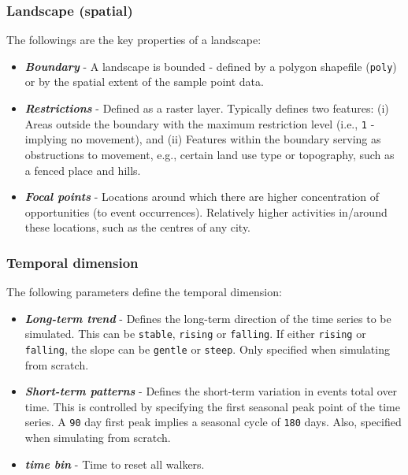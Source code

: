 \documentclass[
  16pt,
]{article}
\providecommand{\tightlist}{%
  \setlength{\itemsep}{0pt}\setlength{\parskip}{0pt}}
\begin{document}
\hypertarget{landscape-spatial}{%
\subsubsection{Landscape (spatial)}\label{landscape-spatial}}

The followings are the key properties of a landscape:

\begin{itemize}
\tightlist
\item
  \textbf{\emph{Boundary}} - A landscape is bounded - defined by a
  polygon shapefile (\texttt{poly}) or by the spatial extent of the
  sample point data.
\item
  \textbf{\emph{Restrictions}} - Defined as a raster layer. Typically
  defines two features: (i) Areas outside the boundary with the maximum
  restriction level (i.e., \texttt{1} - implying no movement), and (ii)
  Features within the boundary serving as obstructions to movement,
  e.g., certain land use type or topography, such as a fenced place and
  hills.
\item
  \textbf{\emph{Focal points}} - Locations around which there are higher
  concentration of opportunities (to event occurrences). Relatively
  higher activities in/around these locations, such as the centres of
  any city.
\end{itemize}

\hypertarget{temporal-dimension}{%
\subsubsection{Temporal dimension}\label{temporal-dimension}}

The following parameters define the temporal dimension:

\begin{itemize}
\tightlist
\item
  \textbf{\emph{Long-term trend}} - Defines the long-term direction of
  the time series to be simulated. This can be \texttt{stable},
  \texttt{rising} or \texttt{falling}. If either \texttt{rising} or
  \texttt{falling}, the slope can be \texttt{gentle} or \texttt{steep}.
  Only specified when simulating from scratch.
\item
  \textbf{\emph{Short-term patterns}} - Defines the short-term variation
  in events total over time. This is controlled by specifying the first
  seasonal peak point of the time series. A \texttt{90} day first peak
  implies a seasonal cycle of \texttt{180} days. Also, specified when
  simulating from scratch.
\item
  \textbf{\emph{time bin}} - Time to reset all walkers.
\end{itemize}
\end{document}
